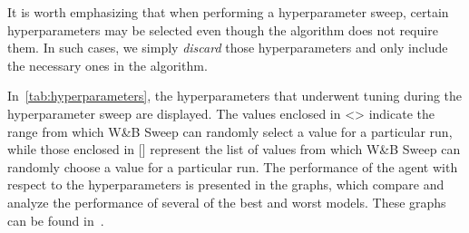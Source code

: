 \documentclass[../xlapes02]{subfiles}
\begin{document}
    It is worth emphasizing that when performing a hyperparameter sweep, certain hyperparameters may be selected even though the algorithm does not require them. In such cases, we simply \emph{discard} those hyperparameters and only include the necessary ones in the algorithm.

    In~\cref{tab:hyperparameters}, the hyperparameters that underwent tuning during the hyperparameter sweep are displayed. The values enclosed in <> indicate the range from which W\&B Sweep can randomly select a value for a particular run, while those enclosed in [] represent the list of values from which W\&B Sweep can randomly choose a value for a particular run. The performance of the agent with respect to the hyperparameters is presented in the graphs, which compare and analyze the performance of several of the best and worst models. These graphs can be found in~.
\end{document}
